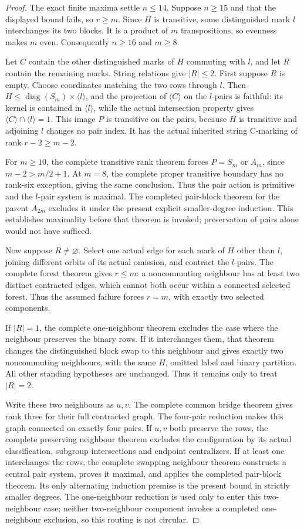 \documentclass[11pt,a4paper]{article}
\newcommand{\gen}[1]{\langle#1\rangle}
\newcommand{\diag}{\operatorname{diag}}
\begin{document}
\begin{proof}
The exact finite maxima settle $n\le14$. Suppose $n\ge15$
and that the displayed bound fails, so $r\ge m$. Since $H$
is transitive, some distinguished mark $l$ interchanges its two
blocks. It is a product of $m$ transpositions, so evenness makes
$m$ even. Consequently $n\ge16$ and $m\ge8$.

Let $C$ contain the other distinguished marks of $H$ commuting
with $l$, and let $R$ contain the remaining marks. String relations
give $|R|\le2$. First suppose $R$ is empty. Choose coordinates
matching the two rows through $l$. Then
$H\le\diag(S_m)\times\gen l$, and the projection of
$\gen C$ on the $l$-pairs is faithful: its kernel is contained
in $\gen l$, while the actual intersection property gives
$\gen C\cap\gen l=1$. This image $P$ is transitive on the
pairs, because $H$ is transitive and adjoining $l$ changes no
pair index. It has the actual inherited string C-marking of rank
$r-2\ge m-2$.

For $m\ge10$, the complete transitive rank theorem forces
$P=S_m$ or $A_m$, since $m-2>m/2+1$. At $m=8$, the complete
proper transitive boundary has no rank-six exception, giving the
same conclusion. Thus the pair action is primitive and the
$l$-pair system is maximal. The completed pair-block theorem
for the parent $A_{2m}$ excludes it under the present explicit
smaller-degree induction. This establishes maximality before
that theorem is invoked; preservation of pairs alone would not
have sufficed.

Now suppose $R\ne\varnothing$. Select one actual edge for each
mark of $H$ other than $l$, joining different orbits of its actual
omission, and contract the $l$-pairs. The complete forest theorem
gives $r\le m$: a noncommuting neighbour has at least two
distinct contracted edges, which cannot both occur within a
connected selected forest. Thus the assumed failure forces
$r=m$, with exactly two selected components.

If $|R|=1$, the complete one-neighbour theorem excludes the case
where the neighbour preserves the binary rows. If it interchanges
them, that theorem changes the distinguished block swap to this
neighbour and gives exactly two noncommuting neighbours, with
the same $H$, omitted label and binary partition. All other
standing hypotheses are unchanged. Thus it remains only to treat
$|R|=2$.

Write these two neighbours as $u,v$. The complete common bridge
theorem gives rank three for their full contracted graph. The
four-pair reduction makes this graph connected on exactly four
pairs. If $u,v$ both preserve the rows, the complete preserving
neighbour theorem excludes the configuration by its actual
classification, subgroup intersections and endpoint centralizers.
If at least one interchanges the rows, the complete swapping
neighbour theorem constructs a central pair system, proves it
maximal, and applies the completed pair-block theorem. Its only
alternating induction premise is the present bound in strictly
smaller degrees. The one-neighbour reduction is used only to
enter this two-neighbour case; neither two-neighbour component
invokes a completed one-neighbour exclusion, so this routing is
not circular.


\end{proof}
\end{document}
